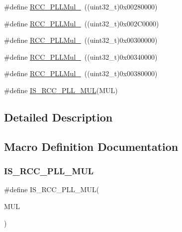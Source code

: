 \begin{DoxyCompactItemize}
\item 
\#define \mbox{\hyperlink{group___p_l_l__multiplication__factor_ga5c6729e9c63b3e84d1a86a6b0f571f88}{R\+C\+C\+\_\+\+P\+L\+L\+Mul\+\_}}~((uint32\+\_\+t)0x00280000)
\item 
\#define \mbox{\hyperlink{group___p_l_l__multiplication__factor_ga78b3638b79c30920c09f18206daafc7a}{R\+C\+C\+\_\+\+P\+L\+L\+Mul\+\_}}~((uint32\+\_\+t)0x002\+C0000)
\item 
\#define \mbox{\hyperlink{group___p_l_l__multiplication__factor_ga457e11adfe1e815eeb5f38de61a94328}{R\+C\+C\+\_\+\+P\+L\+L\+Mul\+\_}}~((uint32\+\_\+t)0x00300000)
\item 
\#define \mbox{\hyperlink{group___p_l_l__multiplication__factor_gaad1fbc2e251391b4c469e39ccf05d642}{R\+C\+C\+\_\+\+P\+L\+L\+Mul\+\_}}~((uint32\+\_\+t)0x00340000)
\item 
\#define \mbox{\hyperlink{group___p_l_l__multiplication__factor_ga98118a80e57ed822485df8a8bef3cb1f}{R\+C\+C\+\_\+\+P\+L\+L\+Mul\+\_}}~((uint32\+\_\+t)0x00380000)
\item 
\#define \mbox{\hyperlink{group___p_l_l__multiplication__factor_gaad04edea77632618678f528dcb2b0cd5}{I\+S\+\_\+\+R\+C\+C\+\_\+\+P\+L\+L\+\_\+\+M\+UL}}(M\+UL)
\end{DoxyCompactItemize}


\subsection{Detailed Description}


\subsection{Macro Definition Documentation}
\mbox{\label{group___p_l_l__multiplication__factor_gaad04edea77632618678f528dcb2b0cd5}} 
\subsubsection{\texorpdfstring{IS\_RCC\_PLL\_MUL}{IS\_RCC\_PLL\_MUL}}
{\footnotesize\ttfamily \#define I\+S\+\_\+\+R\+C\+C\+\_\+\+P\+L\+L\+\_\+\+M\+UL(\begin{DoxyParamCaption}\item[{}]{M\+UL }\end{DoxyParamCaption})}

